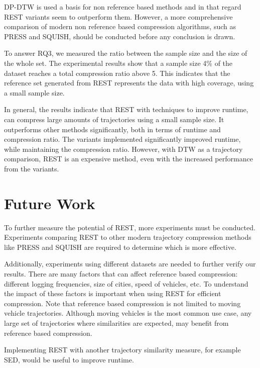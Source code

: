 DP-DTW is used a basis for non reference based methods and in that regard REST variants seem to outperform them. However, a more comprehensive comparison of modern non reference based compression algorithms, such as PRESS and SQUISH, should be conducted before any conclusion is drawn.

To answer RQ3, we measured the ratio between the sample size and the size of the whole set. The experimental results show that a sample size 4\% of the dataset reaches a total compression ratio above 5. This indicates that the reference set generated from REST represents the data with high coverage, using a small sample size.

In general, the results indicate that REST with techniques to improve runtime, can compress large amounts of trajectories using a small sample size. It outperforms other methods significantly, both in terms of runtime and compression ratio. The variants implemented significantly improved runtime, while maintaining the compression ratio. However, with DTW as a trajectory comparison, REST is an expensive method, even with the increased performance from the variants.

\section{Future Work}
To further measure the potential of REST, more experiments must be conducted. Experiments comparing REST to other modern trajectory compression methods like PRESS and SQUISH are required to determine which is more effective.

Additionally, experiments using different datasets are needed to further verify our results. There are many factors that can affect reference based compression: different logging frequencies, size of cities, speed of vehicles, etc. To understand the impact of these factors is important when using REST for efficient compression. Note that reference based compression is not limited to moving vehicle trajectories. Although moving vehicles is the most common use case, any large set of trajectories where similarities are expected, may benefit from reference based compression.

Implementing REST with another trajectory similarity measure, for example SED, would be useful to improve runtime.
